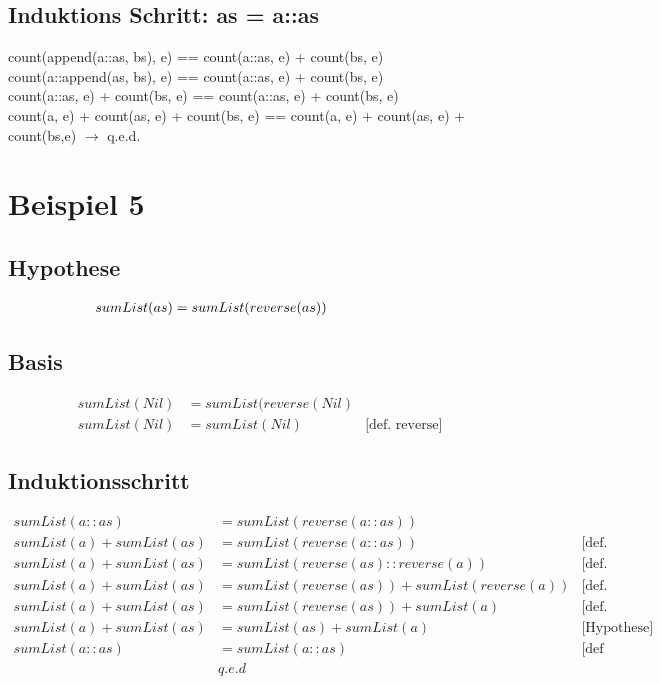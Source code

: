 \documentclass[12pt,runningheads,a4paper]{llncs}
\begin{document}
\subsection*{Induktions Schritt:   as = a::as}
count(append(a::as, bs), e) == count(a::as, e) + count(bs, e)\\
count(a::append(as, bs), e) == count(a::as, e) + count(bs, e)\\
count(a::as, e) + count(bs, e) == count(a::as, e) + count(bs, e)\\ 
count(a, e) + count(as, e) + count(bs, e) == count(a, e) + count(as, e) + count(bs,e) $\rightarrow$ q.e.d.


\section*{Beispiel 5}

\subsection*{Hypothese}
\begin{align*}
sumList(as) &= sumList(reverse(as)) & \hspace*{6em}
\end{align*}

\subsection*{Basis}
\begin{align*}
sumList(Nil) &= sumList(reverse(Nil) \\
sumList(Nil) &= sumList(Nil) & \text{[def. reverse]}
\end{align*}

\subsection*{Induktionsschritt}
\begin{align*}
sumList(a::as) &= sumList(reverse(a::as))\\
sumList(a) + sumList(as) &=  sumList(reverse(a::as)) & \text{[def. sumList]}\\
sumList(a) + sumList(as) &= sumList(reverse(as)::reverse(a)) & \text{[def. reverse]}\\
sumList(a) + sumList(as) &= sumList(reverse(as)) + sumList(reverse(a)) & \text{[def. sumList]}\\
sumList(a) + sumList(as) &= sumList(reverse(as)) + sumList(a) & \text{[def. reverse]}\\
sumList(a) + sumList(as) &= sumList(as) + sumList(a) & \text{[Hypothese]}\\
sumList(a::as) &= sumList(a::as) & \text{[def sumList]}\\
&q.e.d
\end{align*}
\end{document}
